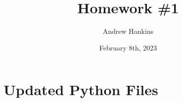 \documentclass[
	12pt, %
]{fphw}
\title{Homework \#1} %
\author{Andrew Hankins} %
\date{February 8th, 2023} %
\institute{University of Alabama \\ College of Engineering} %
\begin{document}
\maketitle %



\section*{Updated Python Files}

\begin{problem}
	
\end{problem}

\begin{problem}
	
\end{problem}

\begin{problem}
	
\end{problem}
\end{document}
